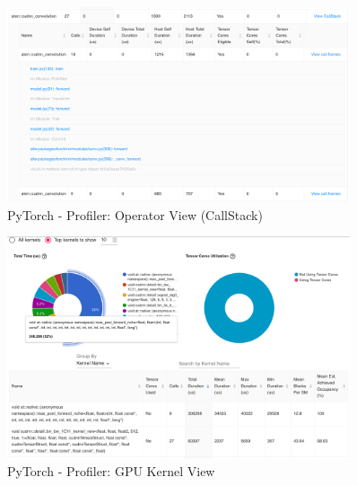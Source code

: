 \documentclass[12pt, a4paper, hidelinks]{article}
\begin{document}
\begin{figure}[H]
\centering
\includegraphics[width=0.9\textwidth]{./assets/scap_gtx1080_profiler-torch_batch-size-64_14650758_operator-view-details}
\caption[PyTorch - Profiler: Operator View (CallStack)]{PyTorch - Profiler: Operator View (CallStack)}
\label{fig:scap_gtx1080_profiler-torch_batch-size-64_14650758_operator-view-details}
\end{figure}

\begin{figure}[H]
\centering
\includegraphics[width=0.9\textwidth]{./assets/scap_gtx1080_profiler-torch_batch-size-64_14650758_gpu-kernel-view}
\caption[PyTorch - Profiler: GPU Kernel View]{PyTorch - Profiler: GPU Kernel View}
\label{fig:scap_gtx1080_profiler-torch_batch-size-64_14650758_gpu-kernel-view}
\end{figure}
\end{document}

